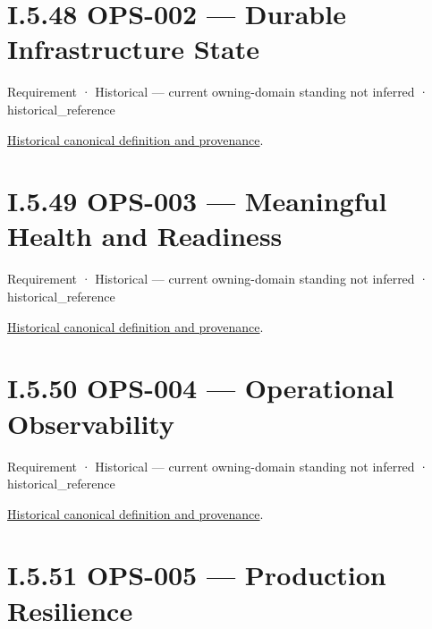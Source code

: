\section*{I.5.48 OPS-002 — Durable Infrastructure State}
\label{navigation:I.5.48}

\label{element:d5d6a9ea450047b1bd62b13177e8fca6}
{\small Requirement · Historical — current owning-domain standing not inferred · historical\_reference}\par
\href{../../../../continuum/motivation/requirement/d5d6a9ea450047b1bd62b13177e8fca6.md}{Historical canonical definition and provenance}.\par
\section*{I.5.49 OPS-003 — Meaningful Health and Readiness}
\label{navigation:I.5.49}

\label{element:4c02fec3af264b878ee3e0cfaecbf55f}
{\small Requirement · Historical — current owning-domain standing not inferred · historical\_reference}\par
\href{../../../../continuum/motivation/requirement/4c02fec3af264b878ee3e0cfaecbf55f.md}{Historical canonical definition and provenance}.\par
\section*{I.5.50 OPS-004 — Operational Observability}
\label{navigation:I.5.50}

\label{element:b5d3447a05b249a8af154136fc36c4d9}
{\small Requirement · Historical — current owning-domain standing not inferred · historical\_reference}\par
\href{../../../../continuum/motivation/requirement/b5d3447a05b249a8af154136fc36c4d9.md}{Historical canonical definition and provenance}.\par
\section*{I.5.51 OPS-005 — Production Resilience}
\label{navigation:I.5.51}

